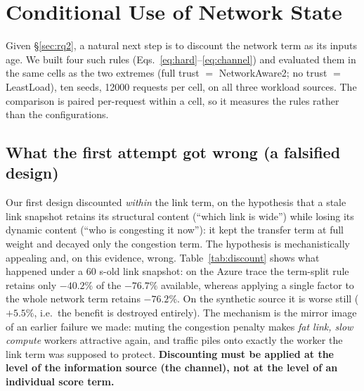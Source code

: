 \section{Conditional Use of Network State}
\label{sec:discount}

Given \S\ref{sec:rq2}, a natural next step is to discount the network term as its inputs age. We
built four such rules (Eqs.~\ref{eq:hard}--\ref{eq:channel}) and evaluated them in the same cells
as the two extremes (full trust $=$ NetworkAware2; no trust $=$ LeastLoad), ten seeds,
12000 requests per cell, on all three workload sources. The comparison is paired
per-request within a cell, so it measures the rules rather than the configurations.

\subsection{What the first attempt got wrong (a falsified design)}
Our first design discounted \emph{within} the link term, on the hypothesis that a stale link
snapshot retains its structural content (``which link is wide'') while losing its dynamic content
(``who is congesting it now''): it kept the transfer term at full weight and decayed only the
congestion term. The hypothesis is mechanistically appealing and, on this evidence, wrong.
Table~\ref{tab:discount} shows what happened under a 60 s-old link snapshot: on the
Azure trace the term-split rule retains only $-40.2\%$ of the $-76.7\%$ available, whereas
applying a single factor to the whole network term retains $-76.2\%$. On the synthetic source it
is worse still ($+5.5\%$, i.e.~the benefit is destroyed entirely). The mechanism is the mirror
image of an earlier failure we made: muting the congestion penalty makes \emph{fat link, slow
compute} workers attractive again, and traffic piles onto exactly the worker the link term was
supposed to protect. \textbf{Discounting must be applied at the level of the information source
(the channel), not at the level of an individual score term.}

